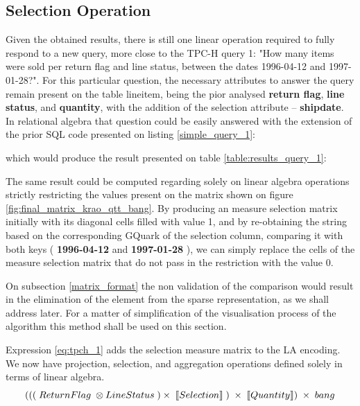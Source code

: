 \subsection{Selection Operation}
Given the obtained results, there is still one linear operation required to fully respond to a new query, more close to the TPC-H query 1: "How many items were sold per return flag and line status, between the dates 
1996-04-12 and 1997-01-28?". For this particular question, the necessary attributes to answer the query remain present on the table lineitem, being the pior analysed \textbf{return flag}, \textbf{line status}, and \textbf{quantity}, with the addition of the selection attribute -- \textbf{shipdate}. In relational algebra that question could be easily answered with the extension of the prior SQL code presented on listing \ref{simple_query_1}:



which would produce the result presented on table \ref{table:results_query_1}:


The same result could be computed regarding solely on linear algebra operations strictly restricting the values present on the matrix shown on figure \ref{fig:final_matrix_krao_qtt_bang}. By producing an measure selection matrix initially with its diagonal cells filled with  value 1, and by re-obtaining the string based on the corresponding GQuark of the selection column, comparing it with both keys ( \textbf{1996-04-12} and \textbf{1997-01-28} ), we can simply replace the cells of the measure selection matrix that do not pass in the restriction with the value 0.\par 
 On subsection \ref{matrix_format} the non validation of the comparison would result in the elimination of the element from the sparse representation, as we shall address later. For a matter of simplification of the visualisation process of the algorithm this method shall be used on this section.\par 
Expression \ref{eq:tpch_1} adds the selection measure matrix to the LA encoding. We now have projection, selection, and aggregation operations defined solely in terms of linear algebra.
\begin{equation}
\centering
\scriptsize
( ( (\ ReturnFlag\ \otimes LineStatus\ ) \times\ \llbracket Selection \rrbracket\ )\ \times\ \llbracket Quantity \rrbracket )\ \times\ bang
\label{eq:tpch_1}
\end{equation}

